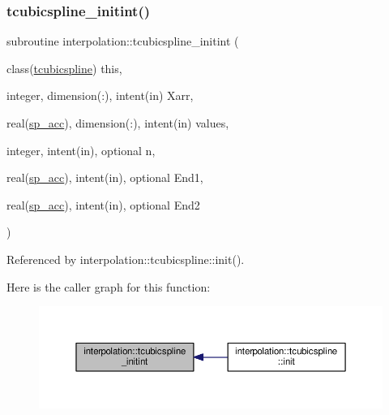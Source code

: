 \mbox{\label{namespaceinterpolation_aa6887491230c995c13b123b7847269ec}} 
\subsubsection{\texorpdfstring{tcubicspline\+\_\+initint()}{tcubicspline\_initint()}}
{\footnotesize\ttfamily subroutine interpolation\+::tcubicspline\+\_\+initint (\begin{DoxyParamCaption}\item[{class(\mbox{\hyperlink{structinterpolation_1_1tcubicspline}{tcubicspline}})}]{this,  }\item[{integer, dimension(\+:), intent(in)}]{Xarr,  }\item[{real(\mbox{\hyperlink{namespaceinterpolation_af72aa9a05feb8ef90b2d26e4a013abf3}{sp\+\_\+acc}}), dimension(\+:), intent(in)}]{values,  }\item[{integer, intent(in), optional}]{n,  }\item[{real(\mbox{\hyperlink{namespaceinterpolation_af72aa9a05feb8ef90b2d26e4a013abf3}{sp\+\_\+acc}}), intent(in), optional}]{End1,  }\item[{real(\mbox{\hyperlink{namespaceinterpolation_af72aa9a05feb8ef90b2d26e4a013abf3}{sp\+\_\+acc}}), intent(in), optional}]{End2 }\end{DoxyParamCaption})}



Referenced by interpolation\+::tcubicspline\+::init().

Here is the caller graph for this function\+:
\nopagebreak
\begin{figure}[H]
\begin{center}
\leavevmode
\includegraphics[width=350pt]{namespaceinterpolation_aa6887491230c995c13b123b7847269ec_icgraph}
\end{center}
\end{figure}
\mbox{\label{namespaceinterpolation_a141de3ad802bf42f3810c24e47e31310}} 
